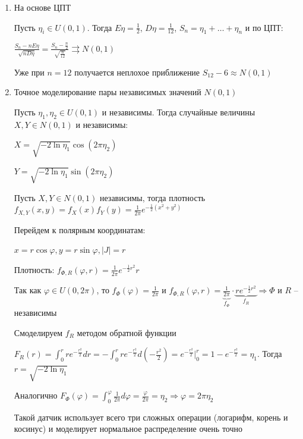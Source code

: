\begin{enumerate}[label*=\Roman*. ]
    \item На основе ЦПТ

    Пусть $\eta_i \in U(0, 1)$. Тогда $E\eta = \frac{1}{2}$, $D\eta = \frac{1}{12}$, $S_n = \eta_1 + \dots + \eta_n$ и по ЦПТ:

    $\frac{S_n - nE\eta}{\sqrt{n D\eta}} = \frac{S_n - \frac{n}{2}}{\sqrt{\frac{n}{12}}} \rightrightarrows N(0, 1)$

    Уже при $n = 12$ получается неплохое приближение $S_{12} - 6 \approx N(0, 1)$ 

    \item Точное моделирование пары независимых значений $N(0, 1)$

    \begin{MyTheorem}
        Пусть $\eta_1, \eta_2 \in U(0, 1)$ и независимы. Тогда случайные величины $X, Y \in N(0, 1)$ и независимы:

        $X = \sqrt{-2\ln \eta_1} \cos (2 \pi \eta_2)$

        $Y = \sqrt{-2\ln \eta_1} \sin (2 \pi \eta_2)$
    \end{MyTheorem}
    
    \begin{MyProof}
        Пусть $X, Y \in N(0, 1)$ независимы, тогда плотность $f_{X, Y}(x, y) = f_X(x)f_Y(y) = \frac{1}{2\pi} e^{-\frac{1}{2} (x^2 + y^2)}$

        Перейдем к полярным координатам:

        $x = r \cos \varphi, y = r \sin \varphi, |J| = r$

        Плотность: $f_{\Phi, R}(\varphi, r) = \frac{1}{2\pi} e^{-\frac{1}{2}r^2} r$

        Так как $\varphi \in U(0, 2\pi)$, то $f_{\Phi}(\varphi) = \frac{1}{2\pi}$ и $f_{\Phi, R}(\varphi, r) = \underset{f_\Phi}{\underbrace{\frac{1}{2\pi}}} \cdot \underset{f_R}{\underbrace{r e^{-\frac{1}{2}r^2}}} \Longrightarrow \Phi$ и $R$ -- независимы 

        Смоделируем $f_R$ методом обратной функции

        $F_R(r) = \int_0^r r e^{-\frac{r^2}{2}} dr = -\int_0^r r e^{-\frac{r^2}{2}} d\left(-\frac{r^2}{2}\right) = e^{-\frac{r^2}{2}} \Big|_0^r = 1 - e^{-\frac{r^2}{2}} = \eta_1$. Тогда $r = \sqrt{-2\ln \eta_1}$

        Аналогично $F_\Phi(\varphi) = \int_0^\varphi \frac{1}{2\pi} d\varphi = \frac{\varphi}{2\pi} = \eta_2 \Longrightarrow \varphi = 2\pi \eta_2$
    \end{MyProof}

    Такой датчик использует всего три сложных операции (логарифм, корень и косинус) и моделирует нормальное распределение очень точно
\end{enumerate}

